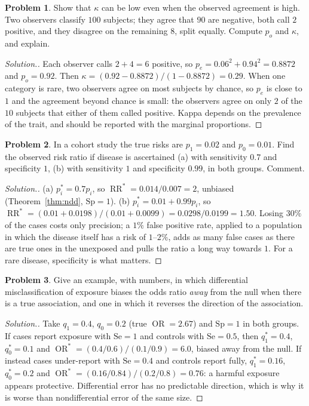 \documentclass[11pt,a4paper]{article}
\numberwithin{equation}{section}
\DeclareMathOperator{\OR}{OR}
\DeclareMathOperator{\RR}{RR}
\theoremstyle{definition}
\newtheorem{problemx}{Problem}[subsection]
\newenvironment{problem}{\begin{problemx}}{\end{problemx}}
\newenvironment{solution}
  {\renewcommand{\qedsymbol}{}\begin{proof}[\textit{Solution}.]}
  {\end{proof}}
\begin{document}
\begin{problem}
Show that $\kappa$ can be low even when the observed agreement is high. Two observers classify $100$ subjects; they agree that $90$ are
negative, both call $2$ positive, and they disagree on the remaining $8$, split equally. Compute $p_o$ and $\kappa$, and explain.
\end{problem}

\begin{solution}
Each observer calls $2 + 4 = 6$ positive, so $p_e = 0.06^2 + 0.94^2 = 0.8872$ and $p_o = 0.92$. Then $\kappa = (0.92 - 0.8872)/(1 - 0.8872) = 0.29$. When one category
is rare, two observers agree on most subjects by chance, so $p_e$ is close to $1$ and the agreement beyond chance is small: the observers
agree on only $2$ of the $10$ subjects that either of them called positive. Kappa depends on the prevalence of the trait, and should be
reported with the marginal proportions.
\end{solution}

\begin{problem}
In a cohort study the true risks are $p_1 = 0.02$ and $p_0 = 0.01$. Find the observed risk ratio if disease is ascertained (a) with
sensitivity $0.7$ and specificity $1$, (b) with sensitivity $1$ and specificity $0.99$, in both groups. Comment.
\end{problem}

\begin{solution}
(a) $p_i^* = 0.7p_i$, so $\RR^* = 0.014/0.007 = 2$, unbiased (Theorem~\ref{thm:ndd}, $\text{Sp} = 1$). (b) $p_i^* = 0.01 + 0.99p_i$, so
$\RR^* = (0.01 + 0.0198)/(0.01 + 0.0099) = 0.0298/0.0199 = 1.50$. Losing $30\%$ of the cases costs only precision; a $1\%$ false positive rate, applied to a
population in which the disease itself has a risk of $1$--$2\%$, adds as many false cases as there are true ones in the unexposed and
pulls the ratio a long way towards $1$. For a rare disease, specificity is what matters.
\end{solution}

\begin{problem}
Give an example, with numbers, in which differential misclassification of exposure biases the odds ratio \emph{away} from the null
when there is a true association, and one in which it reverses the direction of the association.
\end{problem}

\begin{solution}
Take $q_1 = 0.4$, $q_0 = 0.2$ (true $\OR = 2.67$) and $\text{Sp} = 1$ in both groups. If cases report exposure with $\text{Se} = 1$ and controls with
$\text{Se} = 0.5$, then $q_1^* = 0.4$, $q_0^* = 0.1$ and $\OR^* = (0.4/0.6)/(0.1/0.9) = 6.0$, biased away from the null. If instead cases under-report with
$\text{Se} = 0.4$ and controls report fully, $q_1^* = 0.16$, $q_0^* = 0.2$ and $\OR^* = (0.16/0.84)/(0.2/0.8) = 0.76$: a harmful exposure appears protective. Differential
error has no predictable direction, which is why it is worse than nondifferential error of the same size.
\end{solution}
\end{document}

